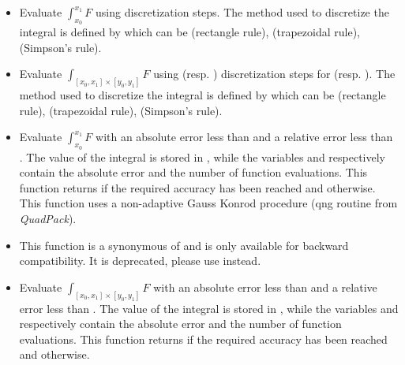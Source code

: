 \begin{itemize}
\item {}
  \sshortdescribe Evaluate $\int_{x_0}^{x_1} F$ using  discretization
  steps. The method used to discretize the integral is defined by 
  which can be  (rectangle rule),  (trapezoidal rule),
   (Simpson's rule).

\item {}
  \sshortdescribe Evaluate $\int_{[x_0, x_1] \times [y_0, y_1]} F$ using
   (resp. ) discretization steps for \var{[x0, x1]}
  (resp. \var{[y0, y1]}). The method used to discretize the integral is
  defined by  which can be  (rectangle rule),
   (trapezoidal rule),    (Simpson's rule).


\item {}
  \sshortdescribe Evaluate $\int_{x_0}^{x_1} F$ with an absolute error less
  than  and a relative error less than . The value of
  the integral is stored in , while the variables  and
   respectively contain the absolute error and the number of function
  evaluations. This function returns  if the required accuracy has been
  reached and  otherwise. This function uses a non-adaptive Gauss
  Konrod procedure (qng routine from {\it QuadPack}).

\item {}
  \sshortdescribe This function is a synonymous of
   and is only available for backward
  compatibility. It is deprecated, please use 
  instead.

\item {}
  \sshortdescribe Evaluate $\int_{[x_0, x_1] \times [y_0, y_1]} F$ with an
  absolute error less than  and a relative error less than
  . The value of the integral is stored in , while the
  variables  and  respectively contain the absolute error
  and the number of function evaluations. This function returns  if the
  required accuracy has been reached and  otherwise.


\end{itemize}
